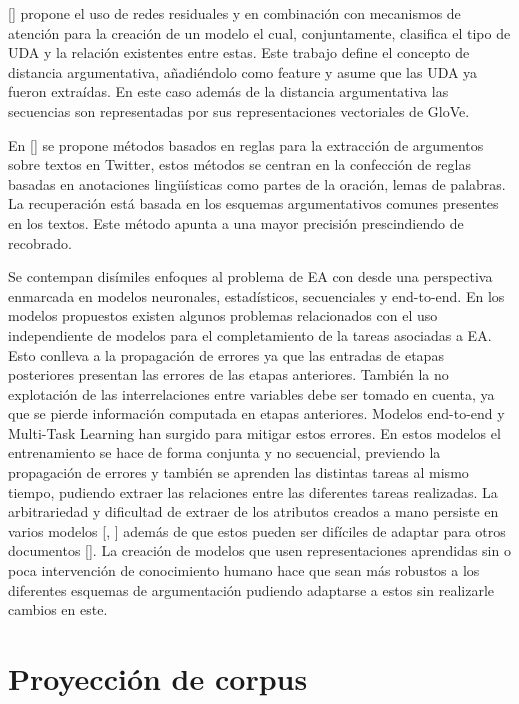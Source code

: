 [\cite{galassi2021deep}] propone el uso de redes residuales y en combinación con mecanismos de atención
para la creación de un modelo el cual, conjuntamente, clasifica el tipo de UDA y la relación existentes entre estas.
Este trabajo define el concepto de distancia argumentativa, añadiéndolo como feature y asume que las UDA ya fueron 
extraídas. En este caso además de la distancia argumentativa las secuencias son representadas por sus representaciones
vectoriales de GloVe.

En [\cite{dykes2020reconstructing}] se propone métodos basados en reglas para la extracción de argumentos sobre
textos en Twitter, estos métodos se centran en la confección de reglas basadas en anotaciones lingüísticas como
partes de la oración, lemas de palabras. La recuperación está basada en los esquemas argumentativos comunes presentes
en los textos. Este método apunta a una mayor precisión prescindiendo de recobrado. 

Se contempan disímiles enfoques al problema de EA con desde una perspectiva enmarcada en modelos neuronales, estadísticos, secuenciales y end-to-end. 
En los modelos propuestos existen algunos problemas relacionados con
el uso independiente de modelos para el completamiento de la tareas asociadas a EA. Esto conlleva a la propagación
de errores ya que las entradas de etapas posteriores presentan las errores de las etapas anteriores.
También la no explotación de las interrelaciones entre variables debe ser tomado en cuenta, ya que se pierde
información computada en etapas anteriores. Modelos end-to-end y 
Multi-Task Learning han surgido para mitigar estos errores. En estos modelos el entrenamiento se hace de forma 
conjunta y no secuencial, previendo la propagación de errores y también se aprenden las distintas tareas al mismo
tiempo, pudiendo extraer las relaciones entre las diferentes tareas realizadas.
La arbitrariedad y dificultad de extraer de los atributos creados a mano persiste en varios modelos [\cite{goudas2015argument}, \cite{palau2009argumentation}]
además de que estos pueden ser difíciles de adaptar para otros documentos [\cite{eger2017neural}].
La creación de modelos que usen representaciones aprendidas sin o poca intervención de conocimiento humano hace 
que sean más robustos a los diferentes esquemas de argumentación pudiendo adaptarse a estos sin 
realizarle cambios en este.

\section{Proyección de corpus}

